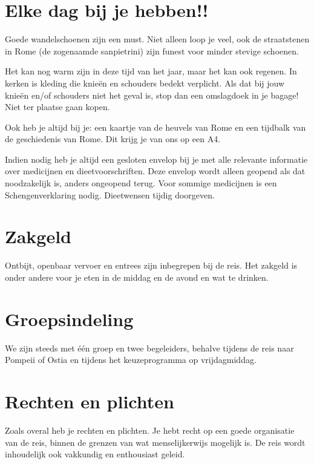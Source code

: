 \documentclass[10pt,twoside,a5paper]{article}
\begin{document}
\newpage
\section*{Elke dag bij je hebben!!}
Goede wandelschoenen zijn een must. Niet alleen loop je veel, ook de straatstenen in Rome (de zogenaamde sanpietrini) zijn funest voor minder stevige schoenen.

Het kan nog warm zijn in deze tijd van het jaar, maar het kan ook regenen. In kerken is kleding die knieën en schouders bedekt verplicht. Als dat bij jouw knieën en/of schouders niet het geval is, stop dan een omslagdoek in je bagage! Niet ter plaatse gaan kopen.

Ook heb je altijd bij je: een kaartje van de heuvels van Rome en een tijdbalk van de geschiedenis van Rome. Dit krijg je van ons op een A4.

Indien nodig heb je altijd een gesloten envelop bij je met alle relevante informatie over medicijnen en dieetvoorschriften. Deze envelop wordt alleen geopend als dat noodzakelijk is, anders ongeopend terug. Voor sommige medicijnen is een Schengenverklaring nodig. Dieetwensen tijdig doorgeven.

\section*{Zakgeld}
Ontbijt, openbaar vervoer en entrees zijn inbegrepen bij de reis. Het zakgeld is onder andere voor je eten in de middag en de avond en wat te drinken.

\section*{Groepsindeling}
We zijn steeds met één groep en twee begeleiders, behalve tijdens de reis naar Pompeii of Ostia en tijdens het keuzeprogramma op vrijdagmiddag.

\begingroup
\small
\setlength{\parskip}{2pt}
\titlespacing*{\section}{0pt}{6pt}{3pt}
\section*{Rechten en plichten}
Zoals overal heb je rechten en plichten. Je hebt recht op een goede organisatie van de reis, binnen de grenzen van wat menselijkerwijs mogelijk is. De reis wordt inhoudelijk ook vakkundig en enthousiast geleid.
\end{document}
